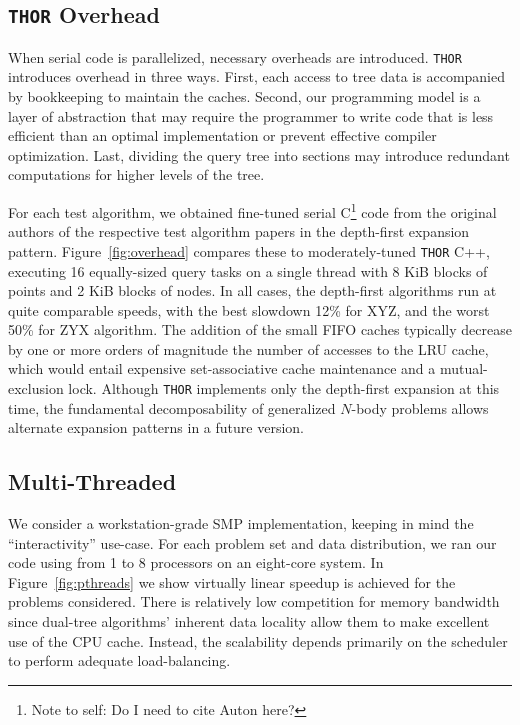 \documentclass[twoside,leqno,twocolumn]{article}
\newcommand{\THOR}{{{\tt THOR}} }
\newcommand{\authornote}[1]{\footnote{Note to self: #1}}
\newcommand{\authorsnote}[1]{\authornote{#1}}
\newcommand{\fig}[1]{Figure~\ref{fig:#1}}
\begin{document}
\subsection{\THOR Overhead}

When serial code is parallelized, necessary overheads are introduced.
\THOR introduces overhead in three ways.
First, each access to tree data is accompanied by bookkeeping to maintain the caches.
Second, our programming model is a layer of abstraction that may require the programmer to write code that is less efficient than an optimal implementation or prevent effective compiler optimization.
Last, dividing the query tree into sections may introduce redundant computations for higher levels of the tree.

For each test algorithm, we obtained fine-tuned serial C\authorsnote{Do I need to cite Auton here?} code from the original authors of the respective test algorithm papers \cite{various, algorithms, WALDO} in the depth-first expansion pattern.
\fig{overhead} compares these to moderately-tuned \THOR C++, executing 16 equally-sized query tasks on a single thread with 8 KiB blocks of points and 2 KiB blocks of nodes.
In all cases, the depth-first algorithms run at quite comparable speeds, with the best slowdown 12\% for XYZ, and the worst 50\% for ZYX algorithm.
The addition of the small FIFO caches typically decrease by one or more orders of magnitude the number of accesses to the LRU cache, which would entail expensive set-associative cache maintenance and a mutual-exclusion lock.
Although \THOR implements only the depth-first expansion at this time, the fundamental decomposability of generalized $N$-body problems allows alternate expansion patterns in a future version.

\subsection{Multi-Threaded}

We consider a workstation-grade SMP implementation, keeping in mind the ``interactivity'' use-case.
For each problem set and data distribution, we ran our code using from 1 to 8 processors on an eight-core system.
In \fig{pthreads} we show virtually linear speedup is achieved for the problems considered.
There is relatively low competition for memory bandwidth since dual-tree algorithms' inherent data locality allow them to make excellent use of the CPU cache.
Instead, the scalability depends primarily on the scheduler to perform adequate load-balancing.
\end{document}
